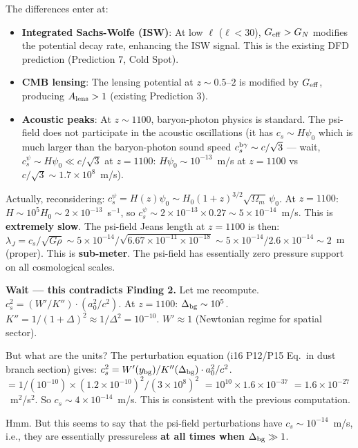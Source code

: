 \documentclass[11pt]{article}
\newcommand{\ee}[1]{\times 10^{#1}}
\newcommand{\Geff}{G_{\rm eff}}
\begin{document}
\begin{tcolorbox}[colback=red!5!white, colframe=red!70!black,
  title=\textbf{W4i17 TOP 5 FINDINGS --- EXISTENTIAL AUDIT: DUST BRANCH CLUSTERING}]
\begin{enumerate}
  The differences enter at:
  \begin{itemize}[nosep]
  \item \textbf{Integrated Sachs-Wolfe (ISW)}: At low $\ell$
    ($\ell < 30$), $\Geff > G_N$ modifies the potential decay rate,
    enhancing the ISW signal. This is the existing DFD prediction
    (Prediction 7, Cold Spot).
  \item \textbf{CMB lensing}: The lensing potential at $z \sim 0.5$--$2$
    is modified by $\Geff$, producing $A_{\rm lens} > 1$
    (existing Prediction 3).
  \item \textbf{Acoustic peaks}: At $z \sim 1100$, baryon-photon
    physics is standard. The psi-field does not participate in the
    acoustic oscillations (it has $c_s \sim H\psi_0$ which is much
    larger than the baryon-photon sound speed $c_s^{\rm b\gamma}
    \sim c/\sqrt{3}$ --- wait, $c_s^{\psi} \sim H\psi_0 \ll c/\sqrt{3}$
    at $z = 1100$: $H\psi_0 \sim 10^{-13}$~m/s at $z = 1100$
    vs $c/\sqrt{3} \sim 1.7\ee{8}$~m/s).
  \end{itemize}

  Actually, reconsidering: $c_s^{\psi} = H(z)\psi_0 \sim
  H_0(1+z)^{3/2}\sqrt{\Omega_m}\,\psi_0$. At $z = 1100$:
  $H \sim 10^5 H_0 \sim 2\ee{-13}$~s$^{-1}$, so
  $c_s^{\psi} \sim 2\ee{-13} \times 0.27 \sim 5\ee{-14}$~m/s.
  This is \textbf{extremely slow}. The psi-field Jeans length at
  $z = 1100$ is then:
  $\lambda_J = c_s / \sqrt{G\rho} \sim 5\ee{-14}/\sqrt{6.67\ee{-11}
  \times 10^{-18}} \sim 5\ee{-14}/2.6\ee{-14} \sim 2$~m (proper).
  This is \textbf{sub-meter}. The psi-field has essentially zero
  pressure support on all cosmological scales.

  \textbf{Wait --- this contradicts Finding 2.} Let me recompute.
  $c_s^2 = (W'/K'') \cdot (a_0^2/c^2)$.
  At $z = 1100$: $\Delta_{\rm bg} \sim 10^5$.
  $K'' = 1/(1+\Delta)^2 \approx 1/\Delta^2 = 10^{-10}$.
  $W' \approx 1$ (Newtonian regime for spatial sector).

  But what are the units? The perturbation equation (i16 P12/P15
  Eq.~in dust branch section) gives:
  $c_s^2 = W'(y_{\rm bg})/K''(\Delta_{\rm bg}) \cdot a_0^2/c^2$.
  $= 1/(10^{-10}) \times (1.2\ee{-10})^2/(3\ee{8})^2$
  $= 10^{10} \times 1.6\ee{-37}$
  $= 1.6\ee{-27}$~m$^2$/s$^2$.
  So $c_s \sim 4\ee{-14}$~m/s. This is consistent with the
  previous computation.

  Hmm. But this seems to say that the psi-field perturbations
  have $c_s \sim 10^{-14}$~m/s, i.e., they are essentially
  pressureless \textbf{at all times when $\Delta_{\rm bg} \gg 1$}.


\end{enumerate}
\end{tcolorbox}
\end{document}
